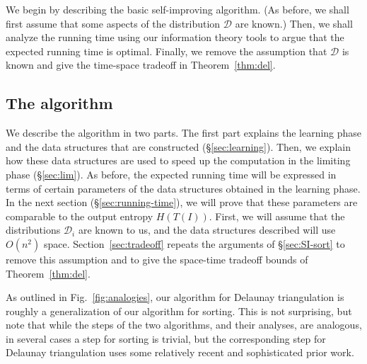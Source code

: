 \documentclass{siamltex}
\newcommand{\D}{\mathcal{D}}
\begin{document}
We begin by describing the basic self-improving algorithm.
(As before, we shall first assume that some aspects of the 
distribution $\D$ are known.) Then,
we shall analyze the running time using our information theory tools
to argue that the expected running time is optimal. 
Finally, we remove the assumption that $\D$ is known and
give the time-space tradeoff in Theorem~\ref{thm:del}.

\subsection{The algorithm}\label{sec:algorithm}

We describe the algorithm in two parts. The first part explains 
the learning phase and the data structures that are constructed 
(\S \ref{sec:learning}).
Then, we explain how these data structures are used to
speed up the computation in the limiting phase (\S \ref{sec:lim}). 
As before, the expected running
time will be expressed in terms of certain parameters of the
data structures obtained in the learning phase. In the next
section (\S \ref{sec:running-time}), we will prove that these parameters are 
comparable to the output 
entropy $H(T(I))$. First, we will assume 
that the distributions $\D_i$ are known to
us, and the data structures described will
use $O(n^2)$ space.
Section~\ref{sec:tradeoff} repeats the arguments
of \S \ref{sec:SI-sort} to remove this assumption and to
give the space-time tradeoff bounds of Theorem~\ref{thm:del}.

As outlined in Fig.~\ref{fig:analogies}, our algorithm
for Delaunay triangulation is roughly a generalization of
our algorithm for sorting.  This is not surprising, but
note that while the steps of the two algorithms, and their
analyses, are analogous, in several cases a step for sorting
is trivial, but the corresponding step for Delaunay triangulation
uses some relatively recent and sophisticated prior work.
\end{document}
